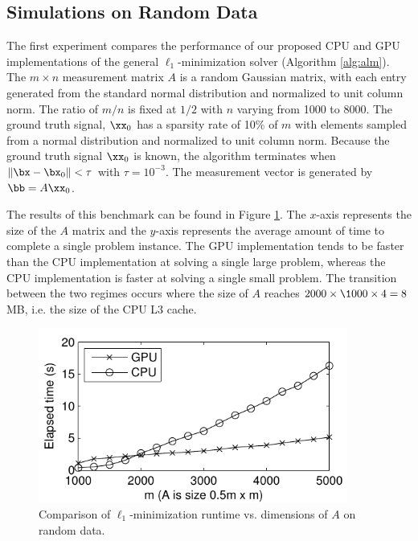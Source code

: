 \subsection{Simulations on Random Data}
\label{sec:simulation}

The first experiment compares the performance of our proposed CPU and GPU
implementations of the general $\ell_1$-minimization solver (Algorithm \eqref{alg:alm}).
The $m \times n$ measurement matrix $A$ is a random Gaussian matrix, with each
entry generated from the standard normal distribution and normalized to unit
column norm.  The ratio of $m/n$ is fixed at $1/2$ with $n$ varying from 1000 to 8000.
The ground truth signal, $\xx_0$ has a sparsity rate of 10\% of $m$ with
elements sampled from a normal distribution and normalized to unit column
norm.  Because the ground truth signal $\xx_0$ is known, the algorithm
terminates when $\|\bx-\bx_0\| < \tau$ with $\tau=10^{-3}$.  The measurement
vector is generated by $\bb = A \xx_0$.   

The results of this benchmark can be found in Figure \ref{fig:random_data}.
The $x$-axis represents the size of the $A$ matrix and the $y$-axis represents the
average amount of time to complete a single problem instance.  The GPU
implementation tends to be faster than the CPU implementation at solving a
single large problem, whereas the CPU implementation is faster at solving a
single small problem.  The transition between the two regimes occurs where the size of
$A$ reaches $2000 \times \1000 \times 4 = 8$ MB, i.e. the size of the CPU L3 cache. 
\begin{figure}
\begin{center}
\includegraphics[width=4in]{figures_ijcb/time_vs_matrix_size_constant_tol.pdf}
\end{center} 
\caption{\small Comparison of $\ell_1$-minimization runtime vs. dimensions of $A$ on random data.} 
\label{fig:random_data}
\end{figure}

